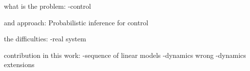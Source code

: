 what is the problem:
-control

and approach:
Probabilistic inference for control

the difficulties:
-real system

contribution in this work:
-sequence of linear models
-dynamics wrong
-dynamics extensions

